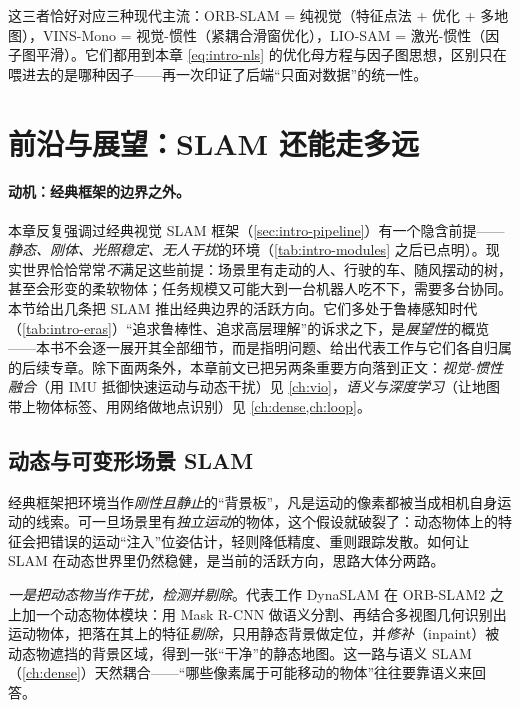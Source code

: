 \noindent 这三者恰好对应三种现代主流：ORB-SLAM = 纯视觉（特征点法 + 优化 + 多地图），VINS-Mono = 视觉-惯性（紧耦合滑窗优化），LIO-SAM = 激光-惯性（因子图平滑）。它们都用到本章 \cref{eq:intro-nls} 的优化母方程与因子图思想，区别只在喂进去的是哪种因子——再一次印证了后端“只面对数据”的统一性。

\section{前沿与展望：SLAM 还能走多远}
\label{sec:intro-frontier}

\paragraph{动机：经典框架的边界之外。}
本章反复强调过经典视觉 SLAM 框架（\cref{sec:intro-pipeline}）有一个隐含前提——\emph{静态、刚体、光照稳定、无人干扰}的环境（\cref{tab:intro-modules} 之后已点明）。现实世界恰恰常常\emph{不}满足这些前提：场景里有走动的人、行驶的车、随风摆动的树，甚至会形变的柔软物体；任务规模又可能大到一台机器人吃不下，需要多台协同。本节给出几条把 SLAM 推出经典边界的活跃方向。它们多处于鲁棒感知时代（\cref{tab:intro-eras}）“追求鲁棒性、追求高层理解”的诉求之下，是\emph{展望性}的概览——本书不会逐一展开其全部细节，而是指明问题、给出代表工作与它们各自归属的后续专章。除下面两条外，本章前文已把另两条重要方向落到正文：\emph{视觉-惯性融合}（用 IMU 抵御快速运动与动态干扰）见 \cref{ch:vio}，\emph{语义与深度学习}（让地图带上物体标签、用网络做地点识别）见 \cref{ch:dense,ch:loop}。

\subsection{动态与可变形场景 SLAM}
\label{sec:intro-dynamic}
经典框架把环境当作\emph{刚性且静止}的“背景板”，凡是运动的像素都被当成相机自身运动的线索。可一旦场景里有\emph{独立运动}的物体，这个假设就破裂了：动态物体上的特征会把错误的运动“注入”位姿估计，轻则降低精度、重则跟踪发散。如何让 SLAM 在动态世界里仍然稳健，是当前的活跃方向，思路大体分两路\cite{cadena2016past}。

\emph{一是把动态物当作干扰，检测并剔除}。代表工作 DynaSLAM\cite{bescos2018dynaslam} 在 ORB-SLAM2 之上加一个动态物体模块：用 Mask R-CNN 做语义分割、再结合多视图几何识别出运动物体，把落在其上的特征\emph{剔除}，只用静态背景做定位，并\emph{修补}（inpaint）被动态物遮挡的背景区域，得到一张“干净”的静态地图。这一路与语义 SLAM（\cref{ch:dense}）天然耦合——“哪些像素属于可能移动的物体”往往要靠语义来回答。

